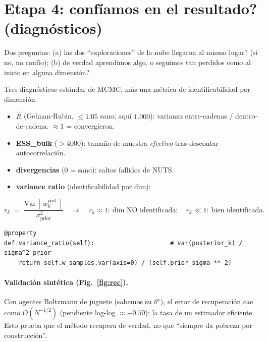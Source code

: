 \documentclass[11pt]{article}
\begin{document}
\section{Etapa 4: \textquestiondown conf\'iamos en el resultado? (diagn\'osticos)}
\begin{intu}
Dos preguntas: (a) \textquestiondown las dos ``exploraciones'' de la nube
llegaron al mismo lugar? (si no, no conf\'io); (b) \textquestiondown de verdad
aprendimos algo, o seguimos tan perdidos como al inicio en alguna dimensi\'on?
\end{intu}

\begin{ing}
Tres diagn\'osticos est\'andar de MCMC, m\'as una m\'etrica de identificabilidad
por dimensi\'on:
\begin{itemize}\itemsep1pt
\item \textbf{$\hat R$} (Gelman-Rubin, $\le 1.05$ sano; aqu\'i $1.000$):
varianza entre-cadenas / dentro-de-cadena. $\approx 1$ = convergieron.
\item \textbf{ESS\_bulk} ($>4000$): tama\~no de muestra \emph{efectivo} tras
descontar autocorrelaci\'on.
\item \textbf{divergencias} ($0$ = sano): saltos fallidos de NUTS.
\item \textbf{variance ratio} (identificabilidad por dim):
\end{itemize}
\begin{equation}
r_k \;=\; \frac{\mathrm{Var}\,[\,w_k^{\text{post}}\,]}{\sigma^2_{\text{prior}}}
\quad\Rightarrow\quad
r_k\approx 1:\ \text{dim NO identificada};\quad r_k\ll 1:\ \text{bien identificada.}
\end{equation}
\end{ing}

\begin{lstlisting}[style=py,caption={\texttt{bayesian\_irl.py}: la identificabilidad por dimensi\'on.}]
@property
def variance_ratio(self):                     # var(posterior_k) / sigma^2_prior
    return self.w_samples.var(axis=0) / (self.prior_sigma ** 2)
\end{lstlisting}

\paragraph{Validaci\'on sint\'etica (Fig.~\ref{fig:rec}).} Con agentes Boltzmann
de juguete (sabemos su $\theta^\star$), el error de recuperaci\'on cae como
$O(N^{-1/2})$ (pendiente log-log $\approx -0.50$): la tasa de un estimador
eficiente. Esto prueba que el m\'etodo recupera de verdad, no que ``siempre da
pobreza por construcci\'on''.
\end{document}
